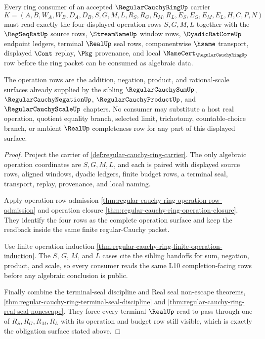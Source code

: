 \begin{theorem}
\label{thm:regular-cauchy-ring-obligation-surface}
Every ring consumer of an accepted $\RegularCauchyRingUp$ carrier
$$
K=(A,B,W_A,W_B,D_A,D_B,S,G,M,L,R_S,R_G,R_M,R_L,E_S,E_G,E_M,E_L,H,C,P,N)
$$
must read exactly the four displayed operation rows $S,G,M,L$ together with the $\RegSeqRatUp$ source rows, $\StreamNameUp$ window rows, $\DyadicRatCoreUp$ endpoint ledgers, terminal $\RealUp$ seal rows, componentwise $\hsame$ transport, displayed $\Cont$ replay, $\Pkg$ provenance, and local $\NameCert_{\RegularCauchyRingUp}$ row before the ring packet can be consumed as algebraic data.

The operation rows are the addition, negation, product, and rational-scale surfaces already supplied by the sibling $\RegularCauchySumUp$, $\RegularCauchyNegationUp$, $\RegularCauchyProductUp$, and $\RegularCauchyScaleUp$ chapters. No consumer may substitute a host real operation, quotient equality branch, selected limit, trichotomy, countable-choice branch, or ambient $\RealUp$ completeness row for any part of this displayed surface.
\end{theorem}
\begin{proof}
Project the carrier of \autoref{def:regular-cauchy-ring-carrier}. The only algebraic operation coordinates are $S,G,M,L$, and each is paired with displayed source rows, aligned windows, dyadic ledgers, finite budget rows, a terminal seal, transport, replay, provenance, and local naming.

Apply operation-row admission \autoref{thm:regular-cauchy-ring-operation-row-admission} and operation closure \autoref{thm:regular-cauchy-ring-operation-closure}. They identify the four rows as the complete operation surface and keep the readback inside the same finite regular-Cauchy packet.

Use finite operation induction \autoref{thm:regular-cauchy-ring-finite-operation-induction}. The $S$, $G$, $M$, and $L$ cases cite the sibling handoffs for sum, negation, product, and scale, so every consumer reads the same L10 completion-facing rows before any algebraic conclusion is public.

Finally combine the terminal-seal discipline and Real seal non-escape theorems, \autoref{thm:regular-cauchy-ring-terminal-seal-discipline} and \autoref{thm:regular-cauchy-ring-real-seal-nonescape}. They force every terminal $\RealUp$ read to pass through one of $R_S,R_G,R_M,R_L$ with its operation and budget row still visible, which is exactly the obligation surface stated above.
\end{proof}


